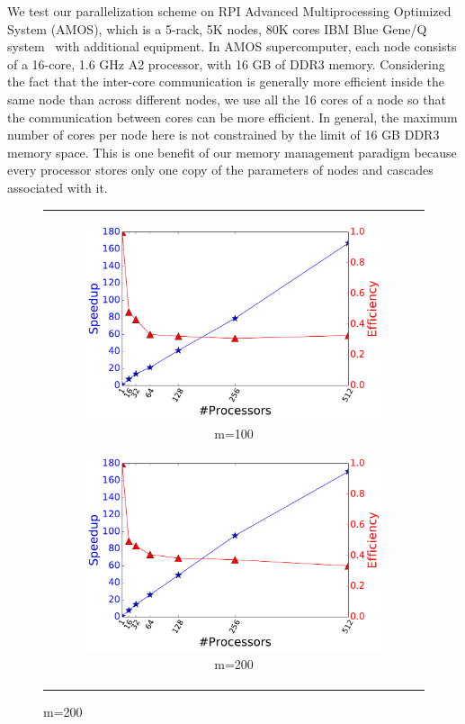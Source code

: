 We test our parallelization scheme on RPI Advanced Multiprocessing Optimized System (AMOS), which is a 5-rack, 5K nodes, 80K cores IBM Blue Gene/Q system~\cite{haring2012ibm} with additional equipment. In AMOS supercomputer, each node consists of a 16-core, 1.6 GHz A2 processor, with 16 GB of DDR3 memory. Considering the fact that the inter-core communication is generally more efficient inside the same node than across different nodes, we use all the 16 cores of a node so that the communication between cores can be more efficient. In general, the maximum number of cores per node here is not constrained by the limit of 16 GB DDR3 memory space. This is one benefit of our memory management paradigm because every processor stores only one copy of the parameters of nodes and cascades associated with it.

\begin{figure}[t]
\centering
\begin{tabular}{c}

\begin{subfigure}{.45\textwidth}
\centering
\includegraphics[width=.99\linewidth]{img/chap3/Speedup_SBM_v1_D100.pdf}
\caption{m=100}\label{fig:Speedup_SBM_v1_D100}
\end{subfigure} 
\begin{subfigure}{.45\textwidth}
\centering
\includegraphics[width=.99\linewidth]{img/chap3/Speedup_SBM_v1_D200.pdf}
\caption{m=200}\label{fig:Speedup_SBM_v1_D200}
\end{subfigure} 


\end{tabular}
\end{figure}
